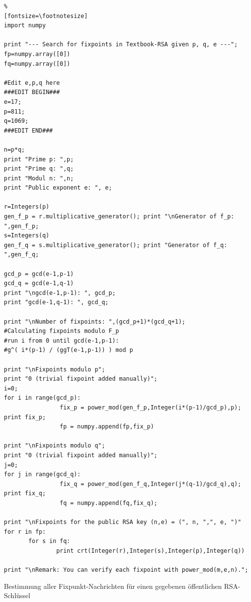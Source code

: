 \begin{refsegment}
\begin{sagecode}
\begin{Verbatim}%
[fontsize=\footnotesize]
import numpy

print "--- Search for fixpoints in Textbook-RSA given p, q, e ---";
fp=numpy.array([0])
fq=numpy.array([0])

#Edit e,p,q here
###EDIT BEGIN###
e=17;
p=811;
q=1069;
###EDIT END###

n=p*q;
print "Prime p: ",p;
print "Prime q: ",q;
print "Modul n: ",n;
print "Public exponent e: ", e;

r=Integers(p)
gen_f_p = r.multiplicative_generator(); print "\nGenerator of f_p: ",gen_f_p;
s=Integers(q)
gen_f_q = s.multiplicative_generator(); print "Generator of f_q: ",gen_f_q;

gcd_p = gcd(e-1,p-1)
gcd_q = gcd(e-1,q-1)
print "\ngcd(e-1,p-1): ", gcd_p;
print "gcd(e-1,q-1): ", gcd_q;

print "\nNumber of fixpoints: ",(gcd_p+1)*(gcd_q+1);
#Calculating fixpoints modulo F_p
#run i from 0 until gcd(e-1,p-1):
#g^( i*(p-1) / (ggT(e-1,p-1)) ) mod p

print "\nFixpoints modulo p";
print "0 (trivial fixpoint added manually)";
i=0;
for i in range(gcd_p):
                fix_p = power_mod(gen_f_p,Integer(i*(p-1)/gcd_p),p); print fix_p;
                fp = numpy.append(fp,fix_p)

print "\nFixpoints modulo q";
print "0 (trivial fixpoint added manually)";
j=0;
for j in range(gcd_q):
                fix_q = power_mod(gen_f_q,Integer(j*(q-1)/gcd_q),q); print fix_q;
                fq = numpy.append(fq,fix_q);

print "\nFixpoints for the public RSA key (n,e) = (", n, ",", e, ")"
for r in fp:
       for s in fq:
               print crt(Integer(r),Integer(s),Integer(p),Integer(q))

print "\nRemark: You can verify each fixpoint with power_mod(m,e,n).";
\end{Verbatim}
\caption{Bestimmung aller Fixpunkt-Nachrichten für einen gegebenen öffentlichen
         RSA-Schlüssel}
\label{nt_sagesample_Calculate_RSA-Fixpoints}
\end{sagecode}



\end{refsegment}
